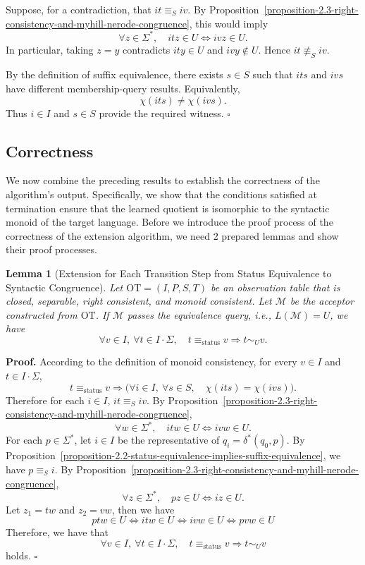 \documentclass{ieice-tecrep}
\newtheorem{lemma}{Lemma}
\begin{document}
Suppose, for a contradiction, that \(it\equiv_S iv\).
By Proposition~\ref{proposition-2.3-right-consistency-and-myhill-nerode-congruence}, this would imply
\[
\forall z\in\Sigma^*,\quad itz\in U\Longleftrightarrow ivz\in U.
\]
In particular, taking \(z=y\) contradicts \(ity\in U\) and
\(ivy\notin U\). Hence \(it\not\equiv_S iv\).

By the definition of suffix equivalence, there exists \(s\in S\)
such that \(its\) and \(ivs\) have different membership-query results.
Equivalently,
\[
\chi(its)\neq \chi(ivs).
\]
Thus \(i\in I\) and \(s\in S\) provide the required witness.
\hfill $\square$

\subsection{Correctness}\label{correctness}

We now combine the preceding results to establish the correctness of
the algorithm's output. Specifically, we show that the conditions
satisfied at termination ensure that the learned quotient is
isomorphic to the syntactic monoid of the target language.
Before we introduce the proof process of the correctness of the extension algorithm,
we need 2 prepared lemmas and show their proof processes.

\begin{lemma}[Extension for Each Transition Step from Status Equivalence to Syntactic Congruence]\label{Extension for each transition step from status equivalence to syntactic congruence}
  Let \(\mathrm{OT}=(I,P,S,T)\) be an observation table that
is closed, separable, right consistent, and monoid consistent. Let
\(\mathcal M\) be the acceptor constructed from \(\mathrm{OT}\). If
\(\mathcal M\) passes the equivalence query, i.e., \(L(\mathcal M)=U\), we have
\[
\forall v\in I,\ \forall t\in I\cdot\Sigma,\quad
t\equiv_{\mathrm{status}}v \Longrightarrow t\sim_U v.
\]
\end{lemma}
\textbf{Proof.} According to the definition of monoid consistency,
for every \(v\in I\) and \(t\in I\cdot\Sigma\),
\[
t\equiv_{\mathrm{status}}v \Longrightarrow
\bigl(\forall i\in I,\ \forall s\in S,\quad \chi(its)=\chi(ivs)\bigr).
\]
Therefore for each \(i\in I\), \(it\equiv_S iv\). 
By Proposition~\ref{proposition-2.3-right-consistency-and-myhill-nerode-congruence}, \[
\forall w\in\Sigma^*,\quad
itw\in U\Longleftrightarrow ivw\in U.
\]
For each \(p \in \Sigma^*\), let \(i \in I\) be the representative of \(q_i = \delta^*(q_0,p)\). 
By Proposition~\ref{proposition-2.2-status-equivalence-implies-suffix-equivalence}, we have \(p\equiv_S i\).
By Proposition~\ref{proposition-2.3-right-consistency-and-myhill-nerode-congruence},
\[
\forall z\in\Sigma^*,\quad pz\in U \Longleftrightarrow iz\in U.
\]
Let \(z_1 = tw\) and \(z_2 = vw\), then we have
\[
ptw\in U
\Longleftrightarrow
itw\in U
\Longleftrightarrow
ivw\in U
\Longleftrightarrow
pvw\in U
\]
Therefore, we have that
\[
\forall v\in I,\ \forall t\in I\cdot\Sigma,\quad
t\equiv_{\mathrm{status}}v \Longrightarrow t\sim_U v
\] holds. 
\hfill $\square$
\end{document}
